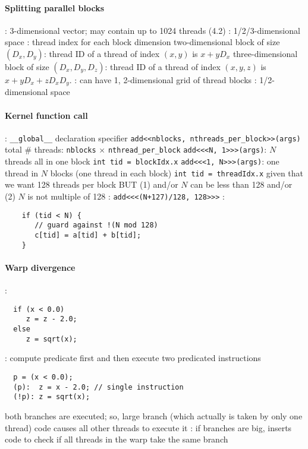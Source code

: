 \documentclass{myart}
\begin{document}
\paragraph{Splitting parallel blocks}
\bit
\w {}: 3-dimensional vector; may contain up to 1024 threads (4.2)
   \bit
   \w {}: 1/2/3-dimensional  space
   \w {}: thread index for each block dimension 
   \w two-dimensional block of size $(D_x, D_y)$: thread ID of a thread of
   index $(x, y)$ is $x + yD_x$
   \w three-dimensional block of size $(D_x, D_y, D_z)$: thread ID of a thread
   of index $(x, y, z)$ is $x + yD_x + zD_xD_y$. 
   \eit
\w {}: can have 1, 2-dimensional grid of thread blocks
  \bit
  \w {}: 1/2-dimensional  space
  \eit

\eit

\paragraph{Kernel function call}
\bit
\w {}: \verb+__global__+ declaration specifier
\w \verb+add<<nblocks, nthreads_per_block>>(args)+
   \bit
   \w total \# threads: \verb+nblocks+ $\times$ \verb+nthread_per_block+
   \eit
\w \verb+add<<<N, 1>>>(args)+: $N$ threads  all in one block
  \bit
  \w \verb+int tid = blockIdx.x+
  \eit
\w \verb+add<<<1, N>>>(args)+: one thread in $N$ blocks 
      (one thread in each block)
  \bit
  \w \verb+int tid = threadIdx.x+
  \eit
\w given that we want 128 threads per block BUT
  (1) and/or $N$ can be less than 128 and/or
  (2) $N$ is not multiple of 128
  \bit
  \w [(1)] : \verb|add<<<(N+127)/128, 128>>>|
  \w [(2)] :
    \begin{verbatim}
    if (tid < N) { 
       // guard against !(N mod 128)
       c[tid] = a[tid] + b[tid];
    }
    \end{verbatim}
  \eit

  
\eit


\paragraph{Warp divergence}
\bit
\w {}:
  \begin{verbatim}
  if (x < 0.0)
     z = z - 2.0;
  else
     z = sqrt(x);
  \end{verbatim}
\w {}: compute predicate first and then execute two predicated instructions
  \begin{verbatim}
  p = (x < 0.0);
  (p):  z = x - 2.0; // single instruction
  (!p): z = sqrt(x);
  \end{verbatim}
  \bit
  \w both branches are executed; so, large branch (which actually is taken by
  only one thread) code causes all other threads to execute it 
  \eit
\w {}: if branches are big,  inserts code to check if
all threads in the warp  take the same branch
\eit
\end{document}
